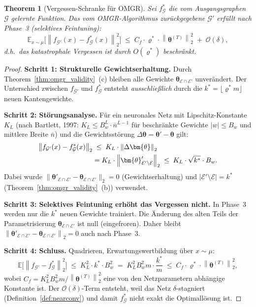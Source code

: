 ﻿\documentclass[12pt, a4paper, openany]{report}
\newtheorem{theorem}{Theorem}[chapter]
\newcommand{\E}{\mathbb{E}}
\newcommand{\calG}{\mathcal{G}}
\newcommand{\calE}{\mathcal{E}}
\newcommand{\norms}[1]{\left\|#1\right\|}
\begin{document}
\begin{theorem}[Vergessen-Schranke für OMGR]
\label{thm:omgr_forgetting}
Sei $f^*_\calG$ die vom Ausgangsgraphen $\calG$ gelernte Funktion.
Das vom OMGR-Algorithmus zurückgegebene $\calG'$ erfüllt nach
Phase~3 (selektives Feintuning):
\begin{equation}
  \label{eq:omgr_forgetting}
  \E_{x \sim \mu}\!\bigl[\norms{f_{\calG'}(x) - f^*_\calG(x)}_2^2\bigr]
  \;\leq\;
  C_f \cdot \varrho^* \cdot \norms{\bm{\theta}^{(T)}}_2^2
  \;+\; \mathcal{O}(\delta),
\end{equation}
d.h.\ das katastrophale Vergessen ist durch $O(\varrho^*)$ beschränkt.
\end{theorem}

\begin{proof}
\textbf{Schritt 1: Strukturelle Gewichtserhaltung.}
Durch Theorem~\ref{thm:omgr_validity}~(c) bleiben alle Gewichte
$\bm{\theta}_{\calE \cap \calE'}$ unverändert.  Der Unterschied zwischen
$f_{\calG'}$ und $f^*_\calG$ entsteht \emph{ausschließlich} durch die
$k^* = \lfloor\varrho^* m\rfloor$ neuen Kantengewichte.

\textbf{Schritt 2: Störungsanalyse.}
Für ein neuronales Netz mit Lipschitz-Konstante $K_L$ (nach Bartlett, 1997:
$K_L \leq B_w^L \cdot \bar{n}^{L-1}$ für beschränkte Gewichte $|w| \leq B_w$
und mittlere Breite $\bar{n}$) und die Gewichtsstörung
$\Delta\bm{\theta} = \bm{\theta}' - \bm{\theta}$ gilt:
\begin{align}
  \norms{f_{\calG'}(x) - f^*_\calG(x)}_2
  &\;\leq\; K_L \cdot \norms{\Delta\bm{\theta}}_2 \notag \\
  &= K_L \cdot \norms{\bm{\theta}'_{\calE' \setminus \calE}}_2
  \;\leq\; K_L \cdot \sqrt{k^*} \cdot B_w.
\end{align}
Dabei wurde $\|\bm{\theta}'_{\calE \cap \calE'} - \bm{\theta}_{\calE \cap \calE'}\|_2 = 0$
(Gewichtserhaltung) und $|\calE' \setminus \calE| = k^*$ (Theorem~\ref{thm:omgr_validity}~(b))
verwendet.

\textbf{Schritt 3: Selektives Feintuning erhöht das Vergessen nicht.}
In Phase~3 werden nur die $k^*$ neuen Gewichte trainiert.  Die Änderung
des alten Teils der Parametrisierung $\bm{\theta}_{\calE \cap \calE'}$
ist null (eingefroren).  Daher bleibt
$\norms{\bm{\theta}'_{\calE \cap \calE'} - \bm{\theta}_{\calE \cap \calE'}}_2 = 0$
auch nach Phase~3.

\textbf{Schritt 4: Schluss.}
Quadrieren, Erwartungswertbildung über $x \sim \mu$:
\[
  \E\!\bigl[\norms{f_{\calG'} - f^*_\calG}_2^2\bigr]
  \;\leq\; K_L^2 \cdot k^* \cdot B_w^2
  \;=\; K_L^2 B_w^2 m \cdot \frac{k^*}{m}
  \;\leq\; C_f \cdot \varrho^* \cdot \norms{\bm{\theta}^{(T)}}_2^2,
\]
wobei $C_f = K_L^2 B_w^2 m / \norms{\bm{\theta}^{(T)}}_2^2$ eine
von den Netzparametern abhängige Konstante ist.  Der $\mathcal{O}(\delta)$-Term
entsteht, weil das Netz $\delta$-stagniert
(Definition~\ref{def:nearconv}) und damit $f^*_\calG$ nicht exakt die
Optimallösung ist.
\end{proof}
\end{document}
